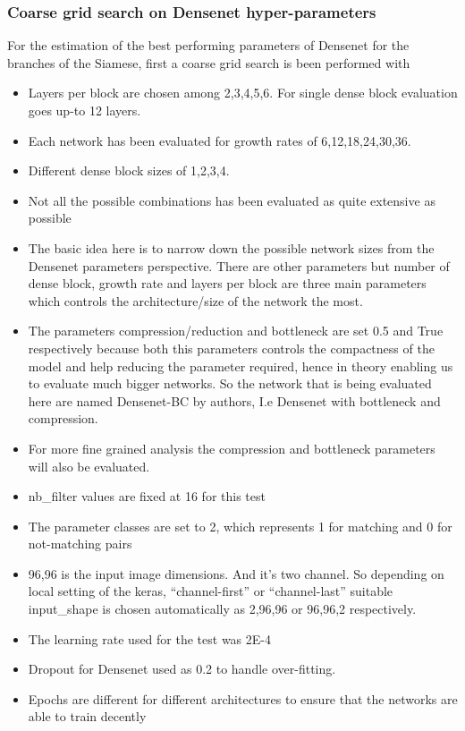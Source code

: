 \subsubsection{Coarse grid search on Densenet hyper-parameters}
For the estimation of the best performing parameters of Densenet for the branches of the Siamese, first a coarse grid search is been performed with 
\begin{itemize}
 \item Layers per block are chosen among 2,3,4,5,6. For single dense block evaluation goes up-to 12 layers. 
 \item Each network has been evaluated for growth rates of 6,12,18,24,30,36. 
 \item Different dense block sizes of 1,2,3,4.  
 \item Not all the possible combinations has been evaluated as quite extensive as possible
 \item The basic idea here is to narrow down the possible network sizes from the Densenet parameters perspective. There are other parameters but number of dense block, 
 growth rate and layers per block are three main parameters which controls the architecture/size of the network the most.
 \item The parameters compression/reduction and bottleneck are set 0.5 and True respectively because both this parameters controls the compactness of the model and help 
 reducing the parameter required, hence in theory enabling us to evaluate much bigger networks. So the network that is being evaluated here are named Densenet-BC by authors, 
 I.e Densenet with bottleneck and compression.
 \item For more fine grained analysis the compression and bottleneck parameters will also be evaluated. 
 \item nb\_filter values are fixed at 16 for this test
 \item The parameter classes are set to 2, which represents 1 for matching and 0 for not-matching pairs
 \item 96,96 is the input image dimensions. And it’s two channel. So depending on local setting of the keras, “channel-first” or “channel-last” suitable input\_shape is 
 chosen automatically as  2,96,96  or 96,96,2 respectively.
 \item The learning rate used for the test was 2E-4
 \item Dropout for Densenet used as 0.2 to handle over-fitting.  
 \item Epochs are different for different architectures to ensure that the networks are able to train decently %

\end{itemize}
